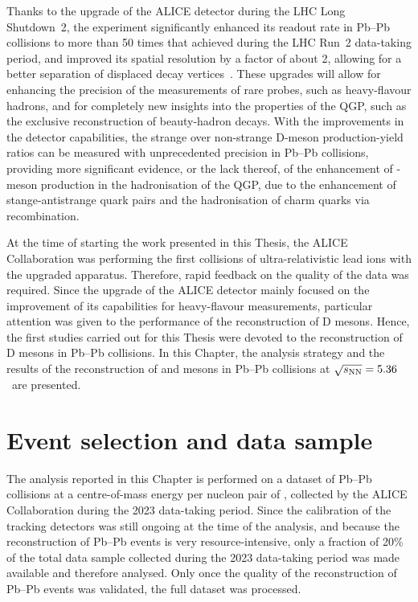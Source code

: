 Thanks to the upgrade of the ALICE detector during the LHC Long Shutdown~2, the experiment significantly enhanced its readout rate in Pb--Pb collisions to more than 50 times that achieved during the LHC Run~2 data-taking period, and improved its spatial resolution by a factor of about 2, allowing for a better separation of displaced decay vertices~\cite{ALICE:2023udb}. These upgrades will allow for enhancing the precision of the measurements of rare probes, such as heavy-flavour hadrons, and for completely new insights into the properties of the QGP, such as the exclusive reconstruction of beauty-hadron decays. With the improvements in the detector capabilities, the strange over non-strange D-meson production-yield ratios can be measured with unprecedented precision in Pb--Pb collisions, providing more significant evidence, or the lack thereof, of the enhancement of \ds-meson production in the hadronisation of the QGP, due to the enhancement of stange-antistrange quark pairs and the hadronisation of charm quarks via recombination.

At the time of starting the work presented in this Thesis, the ALICE Collaboration was performing the first collisions of ultra-relativistic lead ions with the upgraded apparatus. Therefore, rapid feedback on the quality of the data was required. Since the upgrade of the ALICE detector mainly focused on the improvement of its capabilities for heavy-flavour measurements, particular attention was given to the performance of the reconstruction of D mesons. Hence, the first studies carried out for this Thesis were devoted to the reconstruction of D mesons in Pb--Pb collisions. In this Chapter, the analysis strategy and the results of the reconstruction of \ds and \dpl mesons in Pb--Pb collisions at $\sqrt{s_\mathrm{NN}}=5.36$~\tev are presented.

\section{Event selection and data sample}
The analysis reported in this Chapter is performed on a dataset of Pb--Pb collisions at a centre-of-mass energy per nucleon pair of \fivenn, collected by the ALICE Collaboration during the 2023 data-taking period. Since the calibration of the tracking detectors was still ongoing at the time of the analysis, and because the reconstruction of Pb--Pb events is very resource-intensive, only a fraction of 20\% of the total data sample collected during the 2023 data-taking period was made available and therefore analysed. Only once the quality of the reconstruction of Pb--Pb events was validated, the full dataset was processed.

